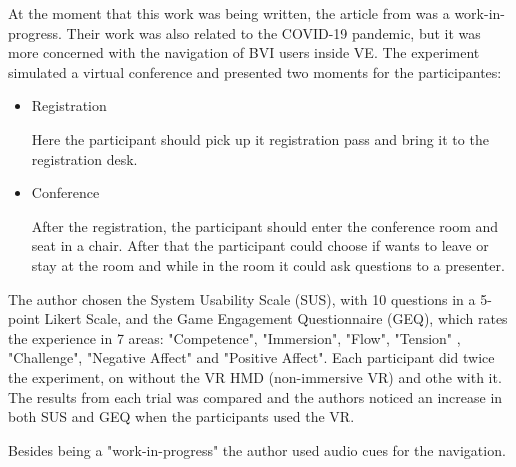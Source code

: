 At the moment that this work was being written, the article from \citeauthor{robern2021work} was a work-in-progress. Their work was also related to the COVID-19 pandemic, but it was more concerned with the navigation of BVI users inside VE.
The experiment simulated a virtual conference and presented two moments for the participantes:

\begin{itemize}
    \item Registration
    
        Here the participant should pick up it registration pass and bring it to the registration desk.
        
    \item Conference
    
        After the registration, the participant should enter the conference room and seat in a chair. After that the participant could choose if wants to leave or stay at the room and while in the room it could ask questions to a presenter.
        
\end{itemize}

The author chosen the System Usability Scale (SUS), with 10 questions in a 5-point Likert Scale, and the Game Engagement Questionnaire (GEQ), which rates the experience in 7 areas: "Competence", "Immersion", "Flow", "Tension" , "Challenge", "Negative Affect" and "Positive Affect". Each participant did twice the experiment, on without the VR HMD (non-immersive VR) and othe with it. The results from each trial was compared and the authors noticed an increase in both SUS and GEQ when the participants used the VR.

Besides being a "work-in-progress" the author used audio cues for the navigation.